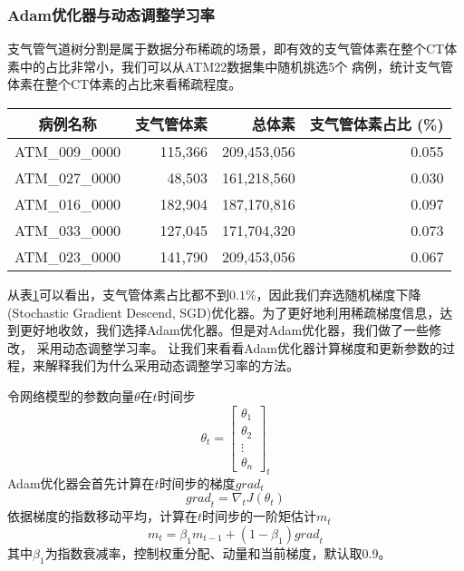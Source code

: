\subsubsection{Adam优化器与动态调整学习率}
支气管气道树分割是属于数据分布稀疏的场景，即有效的支气管体素在整个CT体素中的占比非常小，我们可以从ATM22数据集中随机挑选5个
病例，统计支气管体素在整个CT体素的占比来看稀疏程度。
\begin{table}[!htp]
    \label{tbl:bronchus_voxels}
    \centering
    \begin{tabular}{crrr}
        \toprule
        病例名称 & 支气管体素 & 总体素 & 支气管体素占比 (\%)\\
        \midrule
        ATM\_009\_0000 &	 115,366 &	 209,453,056 &	 0.055 \\
        ATM\_027\_0000 &	 48,503  &	 161,218,560 &	 0.030 \\
        ATM\_016\_0000 &	 182,904 &	 187,170,816 &	 0.097 \\
        ATM\_033\_0000 &	 127,045 &	 171,704,320 &	 0.073 \\
        ATM\_023\_0000 &	 141,790 &	 209,453,056 &	 0.067 \\
        \bottomrule
    \end{tabular}
\end{table}
从表\ref{tbl:bronchus_voxels}可以看出，支气管体素占比都不到$0.1\%$，因此我们弃选随机梯度下降(Stochastic Gradient
Descend, SGD)优化器。为了更好地利用稀疏梯度信息，达到更好地收敛，我们选择Adam优化器。但是对Adam优化器，我们做了一些修改，
采用动态调整学习率。
让我们来看看Adam优化器\cite{Kingma2014AdamAM}计算梯度和更新参数的过程，来解释我们为什么采用动态调整学习率的方法。

令网络模型的参数向量$\theta$在$t$时间步
\begin{equation}
\theta_{t} = \begin{bmatrix}
    \theta_{1} \\
    \theta_{2} \\
    \vdots      \\
    \theta_{n}
\end{bmatrix}_{t}
\end{equation}
Adam优化器会首先计算在$t$时间步的梯度$grad_{t}$
\begin{equation}
    {grad}_{t} = \nabla_{t}J(\theta_{t})
\end{equation}
依据梯度的指数移动平均，计算在$t$时间步的一阶矩估计$m_{t}$
\begin{equation}
    m_{t} = \beta_{1} m_{t-1} + (1 - \beta_{1}) {grad}_{t}
\end{equation}
其中$\beta_{1}$为指数衰减率，控制权重分配、动量和当前梯度，默认取0.9。

